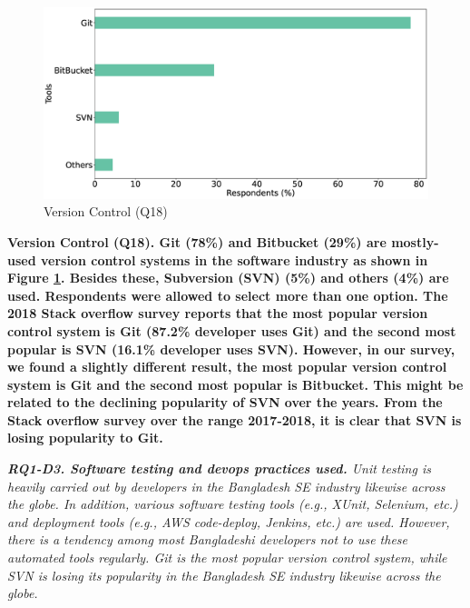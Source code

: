 \begin{figure}[h]
\centering
  \includegraphics[scale=0.16]{Figures/Respondents_version_control}
  \caption{Version Control (Q18)}
  \label{fig:versionControl}
\end{figure}
\bf{Version Control (Q18).} Git (78\%) and Bitbucket (29\%) are mostly-used
version control systems in the software industry as shown in Figure
\ref{fig:versionControl}. Besides these, Subversion (SVN) (5\%) and others (4\%)
are used.  Respondents were allowed to select more than one option. The 2018
Stack overflow survey\citep{StackoverflowSurvey2018} reports that the most
popular version control system is Git (87.2\% developer uses Git) and the second
most popular is SVN (16.1\% developer uses SVN). However, in our survey, we
found a slightly different result, the most popular version control system is
Git and the second most popular is Bitbucket. This might be related to the
declining popularity of SVN over the years. From the Stack overflow survey over
the range 2017-2018, it is clear that SVN is losing popularity to Git. 

\begin{tcolorbox}[flushleft upper,boxrule=1pt,arc=0pt,left=0pt,right=0pt,top=0pt,bottom=0pt,colback=white,after=\ignorespacesafterend\par\noindent]
\nd\it{\bf{RQ1-D3. Software testing and devops practices used.}} Unit testing is
heavily carried out by developers in the Bangladesh SE industry likewise across
the globe. In addition, various software testing
tools (e.g., XUnit, Selenium, etc.) and deployment tools (e.g., AWS code-deploy,
Jenkins, etc.) are used. However, there is a tendency among most
Bangladeshi developers not to use these automated tools regularly. 
Git is the most popular version control system, while SVN is losing
its popularity in the Bangladesh SE industry likewise across the globe.
\end{tcolorbox}
